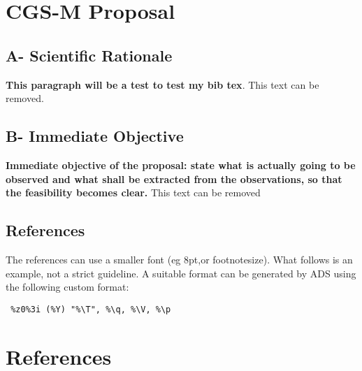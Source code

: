 \documentclass{article}
\begin{document}
\section{CGS-M Proposal}
\subsection{A- Scientific Rationale}

{\bf This paragraph will be a test to test my bib tex}. This text can be removed.

\subsection{B- Immediate Objective}
{\bf Immediate objective of the proposal: state what is actually going to be observed and what shall be extracted from the observations, so that the feasibility becomes clear.} This text can be removed \citep{trugman_tree_2018}

\subsection{References}

The references can use a smaller font (eg 8pt,or footnotesize). What follows is an example, not a strict guideline. A suitable format can be generated by ADS using the following custom format: 
\begin{verbatim} %z0%3i (%Y) "%\T", %\q, %\V, %\p 
\end{verbatim}

\section{References}

\end{document}
